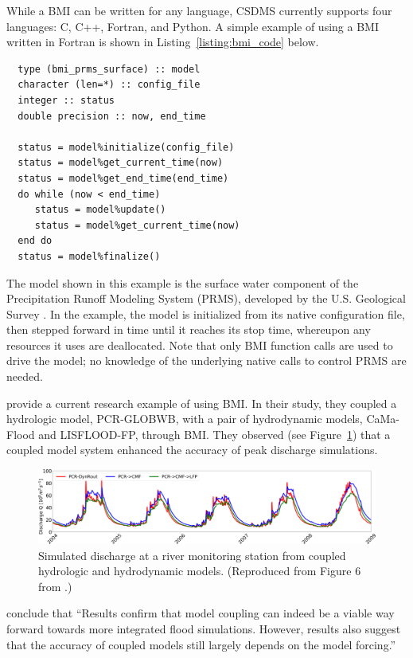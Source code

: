 \documentclass[12pt]{amsart}
\begin{document}
While a BMI can be written for any language,
CSDMS currently supports four languages: C, C++, Fortran, and Python.
A simple example of using a BMI written in Fortran
is shown in Listing~\ref{listing:bmi_code} below.
%
\begin{listing}[ht]
\begin{verbatim}
  type (bmi_prms_surface) :: model
  character (len=*) :: config_file
  integer :: status
  double precision :: now, end_time

  status = model%initialize(config_file)
  status = model%get_current_time(now)
  status = model%get_end_time(end_time)
  do while (now < end_time)
     status = model%update()
     status = model%get_current_time(now)
  end do
  status = model%finalize()
\end{verbatim}
\label{listing:bmi_code}
\end{listing}
%
The model shown in this example
is the surface water component of the Precipitation Runoff Modeling System (PRMS),
developed by the U.S. Geological Survey \citep{leavesley1984precipitation}.
In the example,
the model is initialized from its native configuration file,
then stepped forward in time until it reaches its stop time,
whereupon any resources it uses are deallocated.
Note that only BMI function calls are used to drive the model;
no knowledge of the underlying native calls to control PRMS are needed.

\cite{hoch2019evaluating} provide a current research example of using BMI. 
In their study,
they coupled a hydrologic model, PCR-GLOBWB,
with a pair of hydrodynamic models, CaMa-Flood and LISFLOOD-FP,
through BMI.
They observed (see Figure~\ref{fig:hoch_2019_fig6}) that a coupled model system
enhanced the accuracy of peak discharge simulations.
%
\begin{figure}[h!]
\centering
\includegraphics[scale=0.8]{Figures/nhess-19-1723-2019-f06.png}
\caption{Simulated discharge at a river monitoring station from coupled hydrologic and hydrodynamic models. (Reproduced from Figure 6 from \citet{hoch2019evaluating}.)}
\label{fig:hoch_2019_fig6}
\end{figure}
%
\citeauthor{hoch2019evaluating} conclude
that ``Results confirm that model coupling can indeed be a viable way forward towards more integrated flood simulations. However, results also suggest that the accuracy of coupled models still largely depends on the model forcing.''
\end{document}
